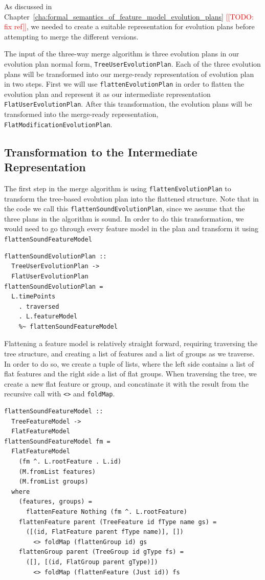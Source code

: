 \documentclass[a4paper,english]{ifimaster}
\newcommand{\todo}[1]{\textcolor{red}{[[TODO: #1]]}\PackageWarning{TODO:}{#1!}}
\begin{document}
As discussed in Chapter~\ref{cha:formal_semantics_of_feature_model_evolution_plans} \todo{fix ref}, we needed to create a suitable representation for evolution plans before attempting to merge the different versions.

The input of the three-way merge algorithm is three evolution plans in our evolution plan normal form, \texttt{TreeUserEvolutionPlan}. Each of the three evolution plans will be transformed into our merge-ready representation of evolution plan in two steps. First we will use \texttt{flattenEvolutionPlan} in order to flatten the evolution plan and represent it as our intermediate representation \texttt{FlatUserEvolutionPlan}. After this transformation, the evolution plans will be transformed into the merge-ready representation, \texttt{FlatModificationEvolutionPlan}.

\subsection{Transformation to the Intermediate Representation}%
\label{sub:transformation_to_the_intermediate_representation}

The first step in the merge algorithm is using \texttt{flattenEvolutionPlan} to transform the tree-based evolution plan into the flattened structure. Note that in the code we call this \texttt{flattenSoundEvolutionPlan}, since we assume that the three plans in the algorithm is sound. In order to do this transformation, we would need to go through every feature model in the plan and transform it using \texttt{flattenSoundFeatureModel}

\begin{verbatim}
flattenSoundEvolutionPlan :: 
  TreeUserEvolutionPlan -> 
  FlatUserEvolutionPlan
flattenSoundEvolutionPlan =
  L.timePoints
    . traversed
    . L.featureModel
    %~ flattenSoundFeatureModel
\end{verbatim}

Flattening a feature model is relatively straight forward, requiring traversing the tree structure, and creating a list of features and a list of groups as we traverse. In order to do so, we create a tuple of lists, where the left side contains a list of flat features and the right side a list of flat groups. When traversing the tree, we create a new flat feature or group, and concatinate it with the result from the recursive call with \texttt{<>} and \texttt{foldMap}.

\begin{verbatim}
flattenSoundFeatureModel :: 
  TreeFeatureModel -> 
  FlatFeatureModel
flattenSoundFeatureModel fm =
  FlatFeatureModel
    (fm ^. L.rootFeature . L.id)
    (M.fromList features)
    (M.fromList groups)
  where
    (features, groups) = 
      flattenFeature Nothing (fm ^. L.rootFeature)
    flattenFeature parent (TreeFeature id fType name gs) =
      ([(id, FlatFeature parent fType name)], [])
        <> foldMap (flattenGroup id) gs
    flattenGroup parent (TreeGroup id gType fs) =
      ([], [(id, FlatGroup parent gType)])
        <> foldMap (flattenFeature (Just id)) fs
\end{verbatim}
\end{document}
